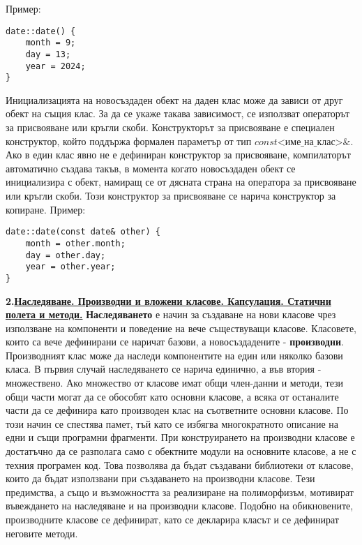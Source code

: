 \documentclass{article}
\begin{document}
Пример: \begin{lstlisting}
date::date() {
    month = 9;
    day = 13;
    year = 2024;
}
\end{lstlisting}
Инициализацията на новосъздаден обект на даден клас може да зависи от друг обект на същия клас. За да се укаже такава зависимост,
се използват операторът за присвояване или кръгли скоби. Конструкторът за присвояване е специален конструктор, който поддържа
формален параметър от тип $const \text{<име\_на\_клас>}\&$. Ако в един клас явно не е дефиниран конструктор за присвояване, компилаторът
автоматично създава такъв, в момента когато новосъздаден обект се инициализира с обект, намиращ се от дясната страна на оператора
за присвояване или кръгли скоби. Този конструктор за присвояване се нарича конструктор за копиране.
Пример: \begin{lstlisting}
date::date(const date& other) {
    month = other.month;
    day = other.day;
    year = other.year;
}
\end{lstlisting}

\textbf{2.\underline{Наследяване. Производни и вложени класове. Капсулация. Статични полета и методи.}} \newline\newline
\textbf{Наследяването} е начин за създаване на нови класове чрез използване на компоненти и поведение на вече съществуващи класове.
Класовете, които са вече дефинирани се наричат базови, а новосъздадените - \textbf{производни}. Производният клас може да наследи
компонентите на един или няколко базови класа. В първия случай наследяването се нарича единично, а във втория - множествено.
Ако множество от класове имат общи член-данни и методи, тези общи части могат да се обособят като основни класове, а всяка от
останалите части да се дефинира като производен клас на съответните основни класове. По този начин се спестява памет, тъй като
се избягва многократното описание на едни и същи програмни фрагменти. При конструирането на производни класове е достатъчно да
се разполага само с обектните модули на основните класове, а не с техния програмен код. Това позволява да бъдат създавани библиотеки
от класове, които да бъдат използвани при създаването на производни класове. Тези предимства, а също и възможността за реализиране
на полиморфизъм, мотивират въвеждането на наследяване и на производни класове. Подобно на обикновените, производните класове се
дефинират, като се декларира класът и се дефинират неговите методи. \newline\newline
\end{document}
